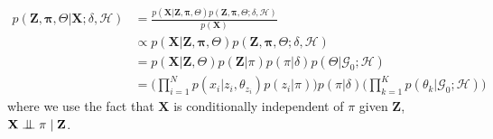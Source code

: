 \begin{equation}%
  \begin{aligned}
	p(\mathbf{Z},\mathbf{\pi},\Theta|\mathbf{X} ;\delta,\mathcal{H}) & = \frac{p(\mathbf{X}|\mathbf{Z},\mathbf{\pi},\Theta) p(\mathbf{Z},\mathbf{\pi},\Theta ;\delta,\mathcal{H})}{p(\mathbf{X})} \\
	   & \propto p(\mathbf{X}|\mathbf{Z},\mathbf{\pi},\Theta) p(\mathbf{Z},\mathbf{\pi},\Theta ;\delta,\mathcal{H}) \\
	   & = p(\mathbf{X}|\mathbf{Z},\Theta) p(\mathbf{Z}|\pi) p(\pi|\delta) p(\Theta |\mathcal{G}_{0}; \mathcal{H}) \\
	   & = \bigg(\prod\limits_{i=1}^{N} p(x_{i}|z_{i},\theta_{z_{i}}) p(z_{i}|\pi)\bigg) p(\pi|\delta) \bigg(\prod\limits_{k=1}^{K} p(\theta_{k} |\mathcal{G}_{0}; \mathcal{H})\bigg)
  \end{aligned}
\end{equation}
where we use the fact that $\mathbf{X}$ is conditionally independent of $\pi$ given $\mathbf{Z}$, \ie $\mathbf{X} \bigCI \pi \;| \; \mathbf{Z} $. 